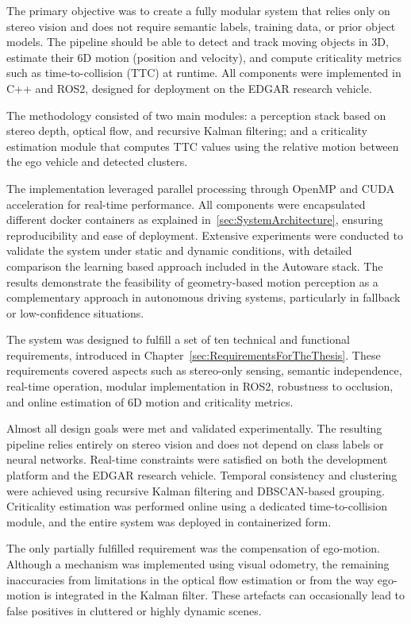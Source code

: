 The primary objective was to create a fully modular system that relies only on 
stereo vision and does not require semantic labels, training data, or prior object 
models. The pipeline should be able to detect and track moving objects in 3D, 
estimate their 6D motion (position and velocity), and compute criticality metrics 
such as time-to-collision (TTC) at runtime. All components were implemented in 
C++ and ROS2, designed for deployment on the EDGAR research vehicle.

The methodology consisted of two main modules: a perception stack based on 
stereo depth, optical flow, and recursive Kalman filtering; and a criticality 
estimation module that computes TTC values using the relative motion between the 
ego vehicle and detected clusters. 

The implementation leveraged parallel processing through OpenMP and CUDA 
acceleration for real-time performance. All components were encapsulated different docker containers
as explained in~\ref{sec:SystemArchitecture}, ensuring reproducibility and ease of deployment. Extensive 
experiments were conducted to validate the system under static and dynamic 
conditions, with detailed comparison the learning based approach included in the Autoware stack. 
The results demonstrate the feasibility of geometry-based motion perception as a 
complementary approach in autonomous driving systems, particularly in fallback or 
low-confidence situations.

The system was designed to fulfill a set of ten technical and functional 
requirements, introduced in Chapter~\ref{sec:RequirementsForTheThesis}. These 
requirements covered aspects such as stereo-only sensing, semantic independence, 
real-time operation, modular implementation in ROS2, robustness to occlusion, 
and online estimation of 6D motion and criticality metrics.

Almost all design goals were met and validated experimentally. The resulting pipeline relies 
entirely on stereo vision and does not depend on class labels or neural 
networks. Real-time constraints were satisfied on both the development platform 
and the EDGAR research vehicle. Temporal consistency and clustering were 
achieved using recursive Kalman filtering and DBSCAN-based grouping. Criticality 
estimation was performed online using a dedicated time-to-collision module, and 
the entire system was deployed in containerized form.

The only partially fulfilled requirement was the compensation of ego-motion. 
Although a mechanism was implemented using visual odometry, the 
remaining inaccuracies from limitations in the optical flow 
estimation or from the way ego-motion is integrated in the Kalman filter. These 
artefacts can occasionally lead to false positives in cluttered or highly 
dynamic scenes. 

